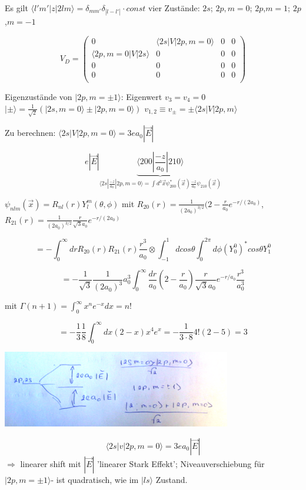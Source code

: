 Es gilt \(\langle l'm'|z|2 l m\rangle = \delta_{mm'}\delta_{|l-l'|}\cdot const\) vier Zustände: \(2s\); \(2p,m=0\); \(2p\),\(m=1\); \(2p\),\(m=-1\)

\[ V_D = 
\begin{pmatrix} 0 & \langle 2s|V| 2p,m=0\rangle&0&0 \\
  \langle 2p,m=0|V| 2s\rangle&0&0&0\\
  0&0&0&0\\
  0&0&0&0\\
\end{pmatrix}
\]

Eigenzustände von \(|2p,m=\pm 1\rangle\): Eigenwert \(v_3=v_4=0\) \(|\pm\rangle=\frac{1}{\sqrt 2}(|2s,m=0\rangle \pm |2p,m=0\rangle)\) \(v_{1,2}\equiv v_{\pm}=\pm \langle 2s|V|2p,m\rangle\)

Zu berechnen: \(\langle 2s|V|2p,m=0\rangle= 3ea_0|\vec E|\)

\[e|\vec E| \underbrace{\langle 200|\frac{-z}{a_0}|210\rangle}_{\langle 2s|\frac{-z}{a_0}|2p,m=0\rangle=\int d^3\vec x \psi^*_{200}(\vec x)\frac{-z}{a_0}\psi_{210} (\vec x) }\]

\(\psi_{nlm}(\vec x) = R_{nl}(r) Y^m_l(\theta,\phi)\) mit \(R_{20}(r) = \frac{1}{(2a_0)^{3/2}}(2-\frac{r}{a_0}e^{-r/(2a_0)}\), \(R_{21}(r) = \frac{1}{(2a_0)^{3/2}}\frac{r}{\sqrt 3 a_0}e^{-r/(2a_0)}\)

\[ = -\int^\infty_0 dr R_{20}(r) R_{21}(r) \frac{r^3}{a_0}\otimes \int^1_{-1}dcos\theta\int^{2\pi}_0 d\phi (Y^0_0)^* cos\theta Y^0_1\]

\[ = -\frac{1}{\sqrt 3} \frac{1}{(2 a_0)^3} a^3_0 \int^\infty_0 \frac{dr}{a_0}(2-\frac{r}{a_0})\frac{r}{\sqrt 3 a_0}e^{-r/a_0}\frac{r^3}{a^3_0}\]

mit \(\Gamma (n+1) = \int^\infty_0 x^ne^{-x}dx=n!\)

\[ = -\frac{1}{3}\frac{1}{8}\int^\infty_0 dx (2-x)x^4e^x = -\frac{1}{3\cdot 8} 4!(2-5)=3\]


\includegraphics[width=0.75\textwidth]{kap03_01.png}


\[ \langle 2s | v | 2p,m=0\rangle = 3ea_0|\vec E|\]
\(\Rightarrow\) linearer shift mit \(|\vec E|\) 'linearer Stark Effekt'; Niveauverschiebung für \(|2p,m=\pm1\rangle\)- ist quadratisch, wie im \(|ls\rangle\) Zustand.

